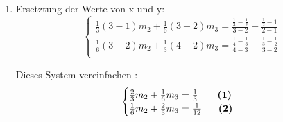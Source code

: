 {\begin{enumerate}
			\begin{equation*}
				\begin{cases}
					\ifthenelse{\not \boolean{isArticleTC}}{
						m_1=m_4=0 \\
						\frac{1}{6}(x_2−x_1)m_1+\frac{1}{3}(x_3−x_1)m_2+\frac{1}{6}(x_3−x_2)m_3=\frac{y_3−y_2}{x_3−x_2}−\frac{y_2−y1}{x_2−x_1} \\
						\frac{1}{6}(x_3−x1)m_2+\frac{1}{3}(x_4−x_2)m_3+\frac{1}{6}(x_4−x_3)m_4=\frac{y_4−y_3}{x_4−x_3}−\frac{y_3−y_2}{x_3−x_2} \\
						Dies entspricht der Lösung des Systems für M2 und M3:
						\frac{1}{3}(x_3−x_1)m_2+\frac{1}{6}(x_3−x_2)m_3=\frac{y_3−y_2}{x_3−x_2}−\frac{y_2−y1}{x_2−x_1} \\
						\frac{1}{6}(x_3−x_1)m_2+\frac{1}{3}(x_4−x_2)m_3=\frac{y_4−y_3}{x_4−x_3}−\frac{y_3−y_2}{x_3−x_2} \\
					}{\frac{1}{3}(x_3−x_1)m_2+\frac{1}{6}(x_3−x_2)m_3= \\ \frac{y_3−y_2}{x_3−x_2}−\frac{y_2−y1}{x_2−x_1} \\
						\frac{1}{6}(x_3−x_1)m_2+\frac{1}{3}(x_4−x_2)m_3= \\ \frac{y_4−y_3}{x_4−x_3}−\frac{y_3−y_2}{x_3−x_2} \\}
					
				\end{cases}
			\end{equation*}
			
			
			\item Ersetztung der Werte von x und y:
			\begin{equation*}
				\begin{cases}
					\frac{1}{3}(3−1)m_2+\frac{1}{6}(3−2)m_3=\frac{\frac{1}{3}−\frac{1}{2}}{3-2}-\frac{\frac{1}{2}−1}{2-1}  \\
					\frac{1}{6}(3-2)m_2+\frac{1}{3}(4-2)m_3=\frac{\frac{1}{4}−\frac{1}{3}}{4-3}-\frac{\frac{1}{3}−\frac{1}{2}}{3-2} \\
				\end{cases}
			\end{equation*}
			
			
			Dieses System vereinfachen :
			\begin{equation*}
				\begin{cases}
					\frac{2}{3}m_2+\frac{1}{6}m_3=\frac{1}{3}  \hspace{2em}  \textbf{(1)}\\
					\frac{1}{6}m_2+\frac{2}{3}m_3=\frac{1}{12} \hspace{1.7em}  \textbf{(2)}\\
				\end{cases}
			\end{equation*}
			

\end{enumerate}}
